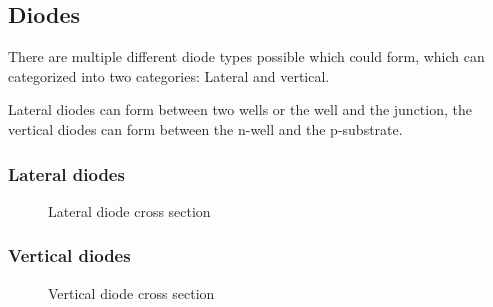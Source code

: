\subsection{Diodes}
There are multiple different diode types possible which could form, which can categorized into two categories: Lateral and vertical.

Lateral diodes can form between two wells or the well and the junction, the vertical diodes can form between the n-well and the p-substrate.

\subsubsection{Lateral diodes}

\begin{figure}[H]
	\centering
	\begin{tikzpicture}[node distance = 3cm, auto, thick,scale=0.5, every node/.style={transform shape}]
		
	\end{tikzpicture}
	\caption{Lateral diode cross section}
	\label{lateral_diode_cross_section}
\end{figure}

\subsubsection{Vertical diodes}

\begin{figure}[H]
	\centering
	\begin{tikzpicture}[node distance = 3cm, auto, thick,scale=0.5, every node/.style={transform shape}]
		
	\end{tikzpicture}
	\caption{Vertical diode cross section}
	\label{vertical_diode_cross_section}
\end{figure}
